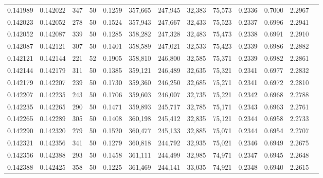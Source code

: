 \begin{tabular}{rrrrrrrrrrrrr}
0.141989 & 0.142022 &   347 &  50 &                                     0.1259 & 357,665 & 247,945 &  32,383 &  75,573 & 0.2336 & 0.7000 & 2.2967 \\
0.142023 & 0.142052 &   278 &  50 &                                     0.1524 & 357,943 & 247,667 &  32,433 &  75,523 & 0.2337 & 0.6996 & 2.2941 \\
0.142052 & 0.142087 &   339 &  50 &                                     0.1285 & 358,282 & 247,328 &  32,483 &  75,473 & 0.2338 & 0.6991 & 2.2910 \\
0.142087 & 0.142121 &   307 &  50 &                                     0.1401 & 358,589 & 247,021 &  32,533 &  75,423 & 0.2339 & 0.6986 & 2.2882 \\
0.142121 & 0.142144 &   221 &  52 &                                     0.1905 & 358,810 & 246,800 &  32,585 &  75,371 & 0.2339 & 0.6982 & 2.2861 \\
0.142144 & 0.142179 &   311 &  50 &                                     0.1385 & 359,121 & 246,489 &  32,635 &  75,321 & 0.2341 & 0.6977 & 2.2832 \\
0.142179 & 0.142207 &   239 &  50 &                                     0.1730 & 359,360 & 246,250 &  32,685 &  75,271 & 0.2341 & 0.6972 & 2.2810 \\
0.142207 & 0.142235 &   243 &  50 &                                     0.1706 & 359,603 & 246,007 &  32,735 &  75,221 & 0.2342 & 0.6968 & 2.2788 \\
0.142235 & 0.142265 &   290 &  50 &                                     0.1471 & 359,893 & 245,717 &  32,785 &  75,171 & 0.2343 & 0.6963 & 2.2761 \\
0.142265 & 0.142289 &   305 &  50 &                                     0.1408 & 360,198 & 245,412 &  32,835 &  75,121 & 0.2344 & 0.6958 & 2.2733 \\
0.142290 & 0.142320 &   279 &  50 &                                     0.1520 & 360,477 & 245,133 &  32,885 &  75,071 & 0.2344 & 0.6954 & 2.2707 \\
0.142321 & 0.142356 &   341 &  50 &                                     0.1279 & 360,818 & 244,792 &  32,935 &  75,021 & 0.2346 & 0.6949 & 2.2675 \\
0.142356 & 0.142388 &   293 &  50 &                                     0.1458 & 361,111 & 244,499 &  32,985 &  74,971 & 0.2347 & 0.6945 & 2.2648 \\
0.142388 & 0.142425 &   358 &  50 &                                     0.1225 & 361,469 & 244,141 &  33,035 &  74,921 & 0.2348 & 0.6940 & 2.2615 \\

\end{tabular}
